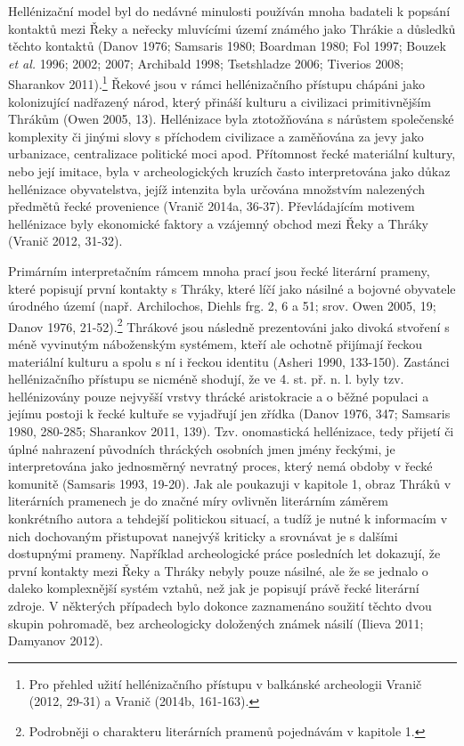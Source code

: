 Hellénizační model byl do nedávné minulosti používán mnoha badateli k popsání kontaktů mezi Řeky a neřecky mluvícími území známého jako Thrákie a důsledků těchto kontaktů (Danov 1976; Samsaris 1980; Boardman 1980; Fol 1997; Bouzek {\em et al.} 1996; 2002; 2007; Archibald 1998; Tsetshladze 2006; Tiverios 2008; Sharankov 2011).\footnote{Pro přehled užití hellénizačního přístupu v balkánské archeologii Vranič (2012, 29-31) a Vranič (2014b, 161-163).} Řekové jsou v rámci hellénizačního přístupu chápáni jako kolonizující nadřazený národ, který přináší kulturu a civilizaci primitivnějším Thrákům (Owen 2005, 13). Hellénizace byla ztotožňována s nárůstem společenské komplexity či jinými slovy s příchodem civilizace a zaměňována za jevy jako urbanizace, centralizace politické moci apod. Přítomnost řecké materiální kultury, nebo její imitace, byla v archeologických kruzích často interpretována jako důkaz hellénizace obyvatelstva, jejíž intenzita byla určována množstvím nalezených předmětů řecké provenience (Vranič 2014a, 36-37). Převládajícím motivem hellénizace byly ekonomické faktory a vzájemný obchod mezi Řeky a Thráky (Vranič 2012, 31-32).

Primárním interpretačním rámcem mnoha prací jsou řecké literární prameny, které popisují první kontakty s Thráky, které líčí jako násilné a bojovné obyvatele úrodného území (např. Archilochos, Diehls frg. 2, 6 a 51; srov. Owen 2005, 19; Danov 1976, 21-52).\footnote{Podrobněji o charakteru literárních pramenů pojednávám v kapitole 1.} Thrákové jsou následně prezentováni jako divoká stvoření s méně vyvinutým náboženským systémem, kteří ale ochotně přijímají řeckou materiální kulturu a spolu s ní i řeckou identitu (Asheri 1990, 133-150). Zastánci hellénizačního přístupu se nicméně shodují, že ve 4. st. př. n. l. byly tzv. hellénizovány pouze nejvyšší vrstvy thrácké aristokracie a o běžné populaci a jejímu postoji k řecké kultuře se vyjadřují jen zřídka (Danov 1976, 347; Samsaris 1980, 280-285; Sharankov 2011, 139). Tzv. onomastická hellénizace, tedy přijetí či úplné nahrazení původních thráckých osobních jmen jmény řeckými, je interpretována jako jednosměrný nevratný proces, který nemá obdoby v řecké komunitě (Samsaris 1993, 19-20). Jak ale poukazuji v kapitole 1, obraz Thráků v literárních pramenech je do značné míry ovlivněn literárním záměrem konkrétního autora a tehdejší politickou situací, a tudíž je nutné k informacím v nich dochovaným přistupovat nanejvýš kriticky a srovnávat je s dalšími dostupnými prameny. Například archeologické práce posledních let dokazují, že první kontakty mezi Řeky a Thráky nebyly pouze násilné, ale že se jednalo o daleko komplexnější systém vztahů, než jak je popisují právě řecké literární zdroje. V některých případech bylo dokonce zaznamenáno soužití těchto dvou skupin pohromadě, bez archeologicky doložených známek násilí (Ilieva 2011; Damyanov 2012).

